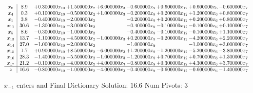 \documentclass[10pt]{article}
\begin{document}
 \[\begin{array}{c| c c@{\hskip 2pt} c@{\hskip 2pt} c@{\hskip 2pt} c@{\hskip 2pt} c@{\hskip 2pt} c@{\hskip 2pt} c@{\hskip 2pt} }
 x_{8}   &  8.9 & + 0.300000 x_{10} & + 1.500000 x_{2} & + 6.000000 x_{3} & -0.600000 x_{9} & + 0.600000 x_{12} & + 0.600000 x_{6} & -0.600000 x_{7}\\
 x_{4}   &  0.3 & + 0.100000 x_{10} & -0.500000 x_{2} & + 1.000000 x_{3} & -0.200000 x_{9} & + 0.200000 x_{12} & + 1.200000 x_{6} & + 0.800000 x_{7}\\
 x_{1}   &  3.8 & -0.400000 x_{10} & -2.000000 x_{2} &   & -0.200000 x_{9} & + 0.200000 x_{12} & + 0.200000 x_{6} & + 0.800000 x_{7}\\
 x_{11}   &  30.6 & -1.300000 x_{10} & -3.000000 x_{2} &   & -0.400000 x_{9} & -0.100000 x_{12} & -0.100000 x_{6} & + 0.100000 x_{7}\\
 x_{5}   &  8.6 & -0.300000 x_{10} & -1.000000 x_{2} &   & -0.400000 x_{9} & -0.100000 x_{12} & -0.100000 x_{6} & + 1.100000 x_{7}\\
 x_{13}   &  13.7 & -1.100000 x_{10} & -4.500000 x_{2} & -1.000000 x_{3} & + 0.200000 x_{9} & -0.200000 x_{12} & -4.200000 x_{6} & + 2.200000 x_{7}\\
 x_{14}   &  27.0 & -1.000000 x_{10} & -2.000000 x_{2} &   & -1.000000 x_{9} &   & -1.000000 x_{6} & + 3.000000 x_{7}\\
 x_{15}   &  1.7 & + 0.900000 x_{10} & + 8.500000 x_{2} & -6.000000 x_{3} & + 1.200000 x_{9} & -1.200000 x_{12} & -5.200000 x_{6} & -3.800000 x_{7}\\
 x_{16}   &  28.3 & -1.400000 x_{10} & -5.500000 x_{2} & -1.000000 x_{3} & -1.200000 x_{9} & + 0.700000 x_{12} & + 0.700000 x_{6} & + 1.300000 x_{7}\\
 x_{17}   &  21.2 & -0.100000 x_{10} & -4.000000 x_{2} & + 4.000000 x_{3} & -0.800000 x_{9} & + 0.300000 x_{12} & + 4.300000 x_{6} & + 3.700000 x_{7}\\
\hline
z    &  16.6 & -0.800000 x_{10} & -1.000000 x_{2} & -4.000000 x_{3} & -0.400000 x_{9} & -0.600000 x_{12} & -0.600000 x_{6} & -1.400000 x_{7}\\
\end{array}\]


 $ x_{-1} $ enters and Final Dictionary
Solution:  16.6
Num Pivots:  3
\end{document}

